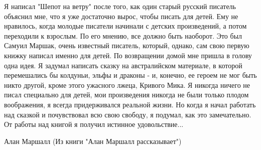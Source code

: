     Я написал "Шепот на ветру" после того, как один старый русский 
писатель объяснил мне, что я уже достаточно вырос, чтобы писать для 
детей. Ему не нравилось, когда молодые писатели начинали с детских 
произведений, а потом переходили к взрослым. По его мнению, все должно 
быть наоборот. Это был Самуил Маршак, очень известный писатель, 
который, однако, сам свою первую книжку написал именно для детей.
    По возвращении домой мне пришла в голову одна идея. Я задумал 
написать сказку на австралийском материале, в которой перемешались бы 
колдуньи, эльфы и драконы - и, конечно, ее героем не мог быть никто 
другой, кроме этого ужасного лжеца, Кривого Мика.
    Я никогда ничего не писал специально для детей, мои произведения 
никогда не были только плодом воображения, я всегда придерживался 
реальной жизни. Но когда я начал работать над сказкой и почувствовал 
всю свою свободу, я подумал, как это замечательно. От работы над 
книгой я получил истинное удовольствие...

                                                     Алан Маршалл
                                (Из книги "Алан Маршалл рассказывает")